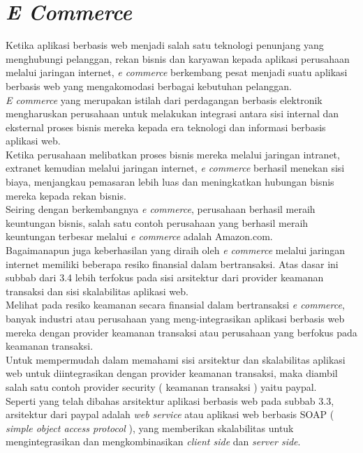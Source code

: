 \section{\textit{E Commerce}}
\tab Ketika aplikasi berbasis web menjadi salah satu teknologi penunjang yang menghubungi pelanggan, rekan bisnis dan karyawan kepada aplikasi perusahaan melalui jaringan internet, \textit{e commerce} berkembang pesat menjadi suatu aplikasi berbasis web yang mengakomodasi berbagai kebutuhan pelanggan.\\
\tab \textit{E commerce} yang merupakan istilah dari perdagangan berbasis elektronik mengharuskan perusahaan untuk melakukan integrasi antara sisi internal dan eksternal proses bisnis mereka kepada era teknologi dan informasi berbasis aplikasi web.\\
\tab Ketika perusahaan melibatkan proses bisnis mereka melalui jaringan intranet, extranet kemudian melalui jaringan internet, \textit{e commerce} berhasil menekan sisi biaya, menjangkau pemasaran lebih luas dan meningkatkan hubungan bisnis mereka kepada rekan bisnis.\\
\tab Seiring dengan berkembangnya \textit{e commerce}, perusahaan berhasil meraih keuntungan bisnis, salah satu contoh perusahaan yang berhasil meraih keuntungan terbesar melalui \textit{e commerce} adalah Amazon.com.\\
\tab Bagaimanapun juga keberhasilan yang diraih oleh \textit{e commerce} melalui jaringan internet memiliki beberapa resiko finansial dalam bertransaksi. Atas dasar ini subbab dari 3.4 lebih terfokus pada sisi arsitektur dari provider keamanan transaksi dan sisi skalabilitas aplikasi web.\\
\tab Melihat pada resiko keamanan secara finansial dalam bertransaksi \textit{e commerce}, banyak industri atau perusahaan yang meng-integrasikan aplikasi berbasis web mereka dengan provider keamanan transaksi atau perusahaan yang berfokus pada keamanan transaksi.\\
\tab Untuk mempermudah dalam memahami sisi arsitektur dan skalabilitas aplikasi web untuk diintegrasikan dengan provider keamanan transaksi, maka diambil salah satu contoh provider security ( keamanan transaksi ) yaitu paypal.\\
\tab Seperti yang telah dibahas arsitektur aplikasi berbasis web pada subbab 3.3, arsitektur dari paypal adalah \textit{web service} atau aplikasi web berbasis SOAP (\textit{ simple object access protocol }), yang memberikan skalabilitas untuk mengintegrasikan dan mengkombinasikan \textit{client side} dan \textit{server side}.
